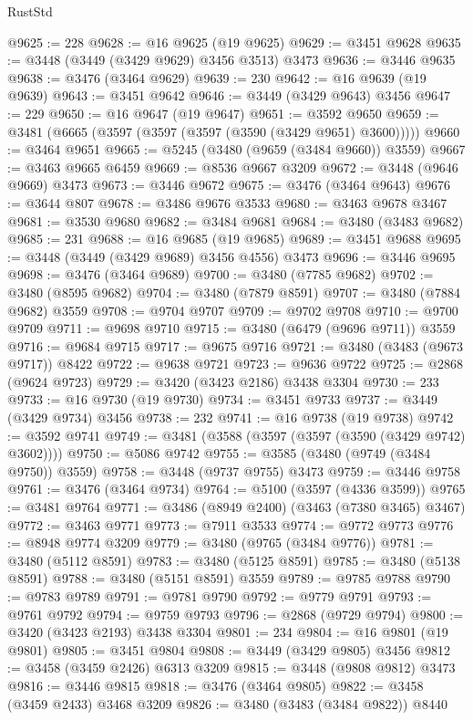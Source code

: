 \begin{lexlean}{RustStd}
\begin{coremodule}
{{{{{{{{{{{{{{{{{{{@9625 := 228
@9628 := @16 @9625 (@19 @9625)
@9629 := @3451 @9628
@9635 := @3448 (@3449 (@3429 @9629) @3456 @3513) @3473
@9636 := @3446 @9635
@9638 := @3476 (@3464 @9629)
@9639 := 230
@9642 := @16 @9639 (@19 @9639)
@9643 := @3451 @9642
@9646 := @3449 (@3429 @9643) @3456
@9647 := 229
@9650 := @16 @9647 (@19 @9647)
@9651 := @3592 @9650
@9659 := @3481 (@6665 (@3597 (@3597 (@3597 (@3590 (@3429 @9651) @3600)))))
@9660 := @3464 @9651
@9665 := @5245 (@3480 (@9659 (@3484 @9660)) @3559)
@9667 := @3463 @9665 @6459
@9669 := @8536 @9667 @3209
@9672 := @3448 (@9646 @9669) @3473
@9673 := @3446 @9672
@9675 := @3476 (@3464 @9643)
@9676 := @3644 @807
@9678 := @3486 @9676 @3533
@9680 := @3463 @9678 @3467
@9681 := @3530 @9680
@9682 := @3484 @9681
@9684 := @3480 (@3483 @9682)
@9685 := 231
@9688 := @16 @9685 (@19 @9685)
@9689 := @3451 @9688
@9695 := @3448 (@3449 (@3429 @9689) @3456 @4556) @3473
@9696 := @3446 @9695
@9698 := @3476 (@3464 @9689)
@9700 := @3480 (@7785 @9682)
@9702 := @3480 (@8595 @9682)
@9704 := @3480 (@7879 @8591)
@9707 := @3480 (@7884 @9682) @3559
@9708 := @9704 @9707
@9709 := @9702 @9708
@9710 := @9700 @9709
@9711 := @9698 @9710
@9715 := @3480 (@6479 (@9696 @9711)) @3559
@9716 := @9684 @9715
@9717 := @9675 @9716
@9721 := @3480 (@3483 (@9673 @9717)) @8422
@9722 := @9638 @9721
@9723 := @9636 @9722
@9725 := @2868 (@9624 @9723)
@9729 := @3420 (@3423 @2186) @3438 @3304
@9730 := 233
@9733 := @16 @9730 (@19 @9730)
@9734 := @3451 @9733
@9737 := @3449 (@3429 @9734) @3456
@9738 := 232
@9741 := @16 @9738 (@19 @9738)
@9742 := @3592 @9741
@9749 := @3481 (@3588 (@3597 (@3597 (@3590 (@3429 @9742) @3602))))
@9750 := @5086 @9742
@9755 := @3585 (@3480 (@9749 (@3484 @9750)) @3559)
@9758 := @3448 (@9737 @9755) @3473
@9759 := @3446 @9758
@9761 := @3476 (@3464 @9734)
@9764 := @5100 (@3597 (@4336 @3599))
@9765 := @3481 @9764
@9771 := @3486 (@8949 @2400) (@3463 (@7380 @3465) @3467)
@9772 := @3463 @9771
@9773 := @7911 @3533
@9774 := @9772 @9773
@9776 := @8948 @9774 @3209
@9779 := @3480 (@9765 (@3484 @9776))
@9781 := @3480 (@5112 @8591)
@9783 := @3480 (@5125 @8591)
@9785 := @3480 (@5138 @8591)
@9788 := @3480 (@5151 @8591) @3559
@9789 := @9785 @9788
@9790 := @9783 @9789
@9791 := @9781 @9790
@9792 := @9779 @9791
@9793 := @9761 @9792
@9794 := @9759 @9793
@9796 := @2868 (@9729 @9794)
@9800 := @3420 (@3423 @2193) @3438 @3304
@9801 := 234
@9804 := @16 @9801 (@19 @9801)
@9805 := @3451 @9804
@9808 := @3449 (@3429 @9805) @3456
@9812 := @3458 (@3459 @2426) @6313 @3209
@9815 := @3448 (@9808 @9812) @3473
@9816 := @3446 @9815
@9818 := @3476 (@3464 @9805)
@9822 := @3458 (@3459 @2433) @3468 @3209
@9826 := @3480 (@3483 (@3484 @9822)) @8440
}}}}}}}}}}}}}}}}}}}
\end{coremodule}
\end{lexlean}
